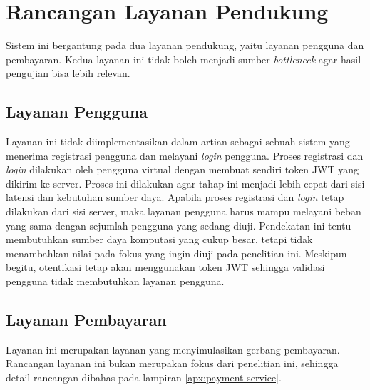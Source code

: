 \section{Rancangan Layanan Pendukung}

Sistem ini bergantung pada dua layanan pendukung, yaitu layanan pengguna dan pembayaran. Kedua layanan ini tidak boleh menjadi sumber \textit{bottleneck} agar hasil pengujian bisa lebih relevan.

\subsection{Layanan Pengguna}

Layanan ini tidak diimplementasikan dalam artian sebagai sebuah sistem yang menerima registrasi pengguna dan melayani \textit{login} pengguna. Proses registrasi dan \textit{login} dilakukan oleh pengguna virtual dengan membuat sendiri token JWT yang dikirim ke server. Proses ini dilakukan agar tahap ini menjadi lebih cepat dari sisi latensi dan kebutuhan sumber daya. Apabila proses registrasi dan \textit{login} tetap dilakukan dari sisi server, maka layanan pengguna harus mampu melayani beban yang sama dengan sejumlah pengguna yang sedang diuji. Pendekatan ini tentu membutuhkan sumber daya komputasi yang cukup besar, tetapi tidak menambahkan nilai pada fokus yang ingin diuji pada penelitian ini. Meskipun begitu, otentikasi tetap akan menggunakan token JWT sehingga validasi pengguna tidak membutuhkan layanan pengguna.

\subsection{Layanan Pembayaran}

Layanan ini merupakan layanan yang menyimulasikan gerbang pembayaran. Rancangan layanan ini bukan merupakan fokus dari penelitian ini, sehingga detail rancangan dibahas pada lampiran \ref{apx:payment-service}.

